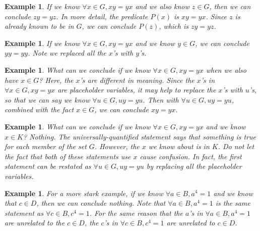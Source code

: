 \documentclass{book}
\newcounter{ekcounter}%
\theoremstyle{ekimcustom}
\newtheorem{example}[ekcounter]{Example}
\begin{document}
\begin{example}
If we know $\forall x \in G, xy=yx$ and we also know $z \in G$, then we can conclude $zy=yz$. In more detail, the predicate $P(x)$ is $xy=yx$. Since $z$ is already known to be in $G$, we can conclude $P(z)$, which is $zy=yz$.
\end{example}
\begin{example}
If we know $\forall x \in G, xy=yx$ and we know $y \in G$, we can conclude $yy=yy$. Note we replaced all the $x$'s with $y$'s.
\end{example}
\begin{example}
What can we conclude if we know $\forall x \in G, xy=yx$ when we also have $x \in G$? Here, the $x$'s are different in meaning. Since the $x$'s in $\forall x \in G, xy=yx$ are placeholder variables, it may help to replace the $x$'s with $u$'s, so that we can say we know $\forall u \in G, uy=yu$. Then with $\forall u \in G, uy=yu$, combined with the fact $x \in G$, we can conclude $xy=yx$.
\end{example}
\begin{example}
What can we conclude if we know $\forall x \in G, xy=yx$ and we know $x \in K$? Nothing. The universally-quantified statement says that something is true for each member of the set $G$. However, the $x$ we know about is in $K$. Do not let the fact that both of these statements use $x$ cause confusion. In fact, the first statement can be restated as $\forall u \in G, uy=yu$ by replacing all the placeholder variables.
\end{example}
\begin{example}
For a more stark example, if we know $\forall a \in B, a^{4}=1$ and we know that $c \in D$, then we can conclude nothing. Note that $\forall a \in B, a^{4}=1$ is the same statement as $\forall c \in B, c^{4}=1$. For the same reason that the $a$'s in $\forall a \in B, a^{4}=1$ are unrelated to the $c \in D$, the $c$'s in $\forall c \in B, c^{4}=1$ are unrelated to $c \in D$.
\end{example}
\end{document}
